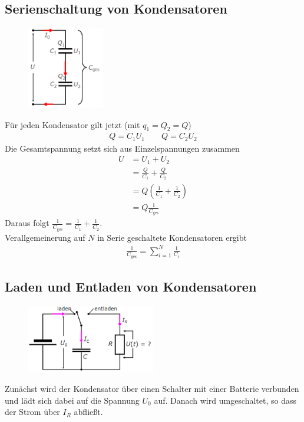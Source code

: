 \documentclass{article}
\begin{document}
\subsection{Serienschaltung von Kondensatoren}
\begin{figure}[H]
    \centering
    \includegraphics[width=0.3\textwidth]{Serienschaltung von Kondensatoren.png}
\end{figure}
Für jeden Kondensator gilt jetzt (mit $q_1=Q_2=Q$)
\begin{align}
    Q=C_1U_1\qquad Q=C_2U_2
\end{align}
Die Gesamtspannung setzt sich aus Einzelspannungen zusammen 
\begin{align}
    U&=U_1+U_2\\
    &=\frac{Q}{C_1}+\frac{Q}{C_2}\\
    &=Q\left(\frac{1}{C_1}+\frac{1}{C_2}\right)\\
    &=Q\frac{1}{C_\text{ges}}
\end{align}
Daraus folgt $\frac{1}{C_\text{ges}}=\frac{1}{C_1}+\frac{1}{C_2}$.\\
Verallgemeinerung auf $N$ in Serie geschaltete Kondensatoren ergibt
\begin{align}
    \frac{1}{C_\text{ges}}=\sum_{i=1}^{N}\frac{1}{C_i}
\end{align}

\subsection{Laden und Entladen von Kondensatoren}
\begin{figure}[H]
    \centering
    \includegraphics[width=0.5\textwidth]{Laden und entladen von Kondensatoren.png}
\end{figure}
Zunächst wird der Kondensator über einen Schalter mit einer Batterie verbunden
und lädt sich dabei auf die Spannung $U_0$ auf. Danach wird umgeschaltet,
so dass der Strom über $I_R$ abfließt.\\
\end{document}
